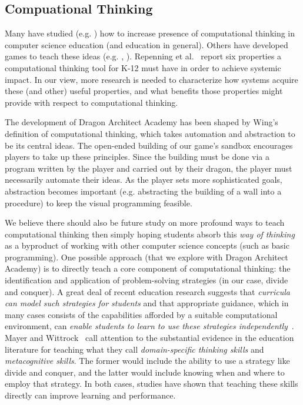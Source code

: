 \documentclass{sig-alternate}
\newcommand{\gametitle}{{\color{RoyalPurple} Dragon Architect Academy}}
\begin{document}
\subsection{Compuational Thinking}

Many have studied (e.g. \cite{barr2011bringing}) how to increase presence of computational thinking in computer science education (and education in general). 
Others have developed games to teach these ideas (e.g. \cite{weintrop2013robobuilder}, \cite{kazimoglu2012serious}). 
Repenning et al.~\cite{repenning2010scalable} report six properties a computational thinking tool for K-12 must have in order to achieve systemic impact. 
In our view, more research is needed to characterize how systems acquire these (and other) useful properties, and what benefits those properties might provide with respect to computational thinking. 

The development of \gametitle{} has been shaped by Wing's~\cite{wing2008computational} definition of computational thinking, which takes automation and abstraction to be its central ideas. 
The open-ended building of our game's sandbox encourages players to take up these principles. 
Since the building must be done via a program written by the player and carried out by their dragon, the player must necessarily automate their ideas. 
As the player sets more sophisticated goals, abstraction becomes important (e.g. abstracting the building of a wall into a procedure) to keep the visual programming feasible. 

We believe there should also be future study on more profound ways to teach computational thinking then simply hoping students absorb this \emph{way of thinking} as a byproduct of working with other computer science concepts (such as basic programming). 
One possible approach (that we explore with \gametitle{}) is to directly teach a core component of computational thinking: the identification and application of problem-solving strategies (in our case, divide and conquer). 
A great deal of recent education research suggests that \emph{curricula can model such strategies for students} and that appropriate guidance, which in many cases consists of the capabilities afforded by a suitable computational environment, can \emph{enable students to learn to use these strategies independently}~\cite{report2010computational}. 
Mayer and Wittrock~\cite{mayer1996handbook} call attention to the substantial evidence in the education literature for teaching what they call \emph{domain-specific thinking skills} and \emph{metacognitive skills}. 
The former would include the ability to use a strategy like divide and conquer, and the latter would include knowing when and where to employ that strategy. 
In both cases, studies have shown that teaching these skills directly can improve learning and performance. 
\end{document}
